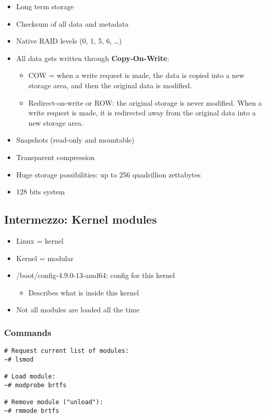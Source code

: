 \documentclass{article}
\begin{document}
\begin{itemize}
    \item Long term storage
    \item Checksum of all data and metadata
    \item Native RAID levels (0, 1, 5, 6, \dots)
    \item All data gets written through \textbf{Copy-On-Write}:
    \begin{itemize}
        \item COW = when a write request is made, the data is copied into a new storage area, and then the original data is modified.
        \item Redirect-on-write or ROW: the original storage is never modified. When a write request is made, it is redirected away from the original data into a new storage area.
    \end{itemize}
    \item Snapshots (read-only and mountable)
    \item Transparent compression
    \item Huge storage possibilities: up to 256 quadrillion zettabytes
    \item 128 bits system
\end{itemize}

\subsection{Intermezzo: Kernel modules}

\begin{itemize}
    \item Linux = kernel
    \item Kernel = modular
    \item /boot/config-4.9.0-13-amd64: config for this kernel
    \begin{itemize}
        \item Describes what is inside this kernel
    \end{itemize}
    \item Not all modules are loaded all the time
\end{itemize}

\subsubsection{Commands}

\begin{verbatim}
# Request current list of modules:
~# lsmod

# Load module:
~# modprobe brtfs

# Remove module ("unload"):
~# rmmode brtfs

\end{verbatim}
\end{document}
